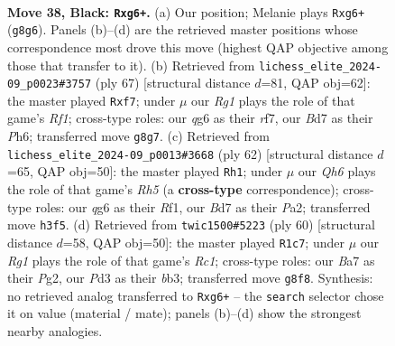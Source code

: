 \documentclass[11pt]{article}
\begin{document}
\clearpage

\begin{figure}[p]\centering
\begin{subfigure}{0.46\textwidth}\centering
\resizebox{\linewidth}{!}{%
\newchessgame
\chessboard[
  setfen={r5rk/bp1b4/p3p1Qp/8/8/BP1p3q/PR3P1P/4R1K1 b - - 5 38},
  showmover=false,
  pgfstyle=straightmove, color=movearrow, markmove={g8-g6}
]}
\caption{}
\end{subfigure}\hfill
\begin{subfigure}{0.46\textwidth}\centering
\resizebox{\linewidth}{!}{%
\newchessgame
\chessboard[
  setfen={3r1rk1/5R2/5Qpp/p4b2/1q1Pp3/1P5P/5PP1/1BR3K1 b - - 0 34},
  showmover=false,
  pgfstyle=straightmove, color=movearrow, markmove={f8-f7}
]}
\caption{}
\end{subfigure}
\\[4pt]
\begin{subfigure}{0.46\textwidth}\centering
\resizebox{\linewidth}{!}{%
\newchessgame
\chessboard[
  setfen={4r1k1/pp3p2/2p3p1/6QR/3P4/2Pq2P1/PP3PB1/4rRK1 w - - 1 32},
  showmover=false,
  pgfstyle=straightmove, color=movearrow, markmove={h5-h1}
]}
\caption{}
\end{subfigure}\hfill
\begin{subfigure}{0.46\textwidth}\centering
\resizebox{\linewidth}{!}{%
\newchessgame
\chessboard[
  setfen={2Rr2k1/3r3p/p2P2p1/1p2Qp2/8/1b3B1P/3q1PP1/2R3K1 w - - 8 31},
  showmover=false,
  pgfstyle=straightmove, color=movearrow, markmove={c1-c7}
]}
\caption{}
\end{subfigure}
\caption{\textbf{Move 38, Black: \texttt{Rxg6+}.} (a) Our position; Melanie plays \texttt{Rxg6+} (\texttt{g8g6}). Panels (b)--(d) are the retrieved master positions whose correspondence most drove this move (highest QAP objective among those that transfer to it). (b) Retrieved from \texttt{lichess\_elite\_2024-09\_p0023\#3757} (ply 67) [structural distance $d$=81, QAP obj=62]: the master played \texttt{Rxf7}; under $\mu$ our \emph{Rg1} plays the role of that game's \emph{Rf1}; cross-type roles: our \emph{q}g6 as their \emph{r}f7, our \emph{B}d7 as their \emph{P}h6; transferred move \texttt{g8g7}. (c) Retrieved from \texttt{lichess\_elite\_2024-09\_p0013\#3668} (ply 62) [structural distance $d$=65, QAP obj=50]: the master played \texttt{Rh1}; under $\mu$ our \emph{Qh6} plays the role of that game's \emph{Rh5} (a \textbf{cross-type} correspondence); cross-type roles: our \emph{q}g6 as their \emph{R}f1, our \emph{B}d7 as their \emph{P}a2; transferred move \texttt{h3f5}. (d) Retrieved from \texttt{twic1500\#5223} (ply 60) [structural distance $d$=58, QAP obj=50]: the master played \texttt{R1c7}; under $\mu$ our \emph{Rg1} plays the role of that game's \emph{Rc1}; cross-type roles: our \emph{B}a7 as their \emph{P}g2, our \emph{P}d3 as their \emph{b}b3; transferred move \texttt{g8f8}. Synthesis: no retrieved analog transferred to \texttt{Rxg6+} -- the \texttt{search} selector chose it on value (material / mate); panels (b)--(d) show the strongest nearby analogies.}
\label{fig:thought-m75}
\end{figure}
\end{document}
